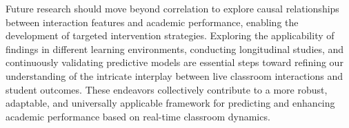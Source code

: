  \par Future research should move beyond correlation to explore causal relationships between interaction features and academic performance, enabling the development of targeted intervention strategies. Exploring the applicability of findings in different learning environments, conducting longitudinal studies, and continuously validating predictive models are essential steps toward refining our understanding of the intricate interplay between live classroom interactions and student outcomes. These endeavors collectively contribute to a more robust, adaptable, and universally applicable framework for predicting and enhancing academic performance based on real-time classroom dynamics.




